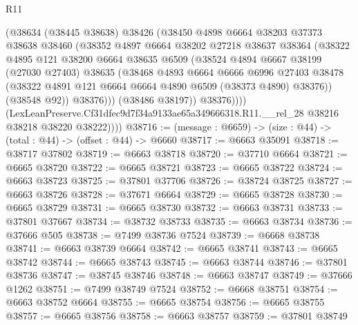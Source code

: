 \begin{lexlean}{R11}
\begin{coremodule}
                  (@38634
                    (@38445 @38638)
                    @38426
                    (@38450
                      @4898
                      @6664
                      @38203
                      @37373
                      @38638
                      @38460
                      (@38352
                        @4897
                        @6664
                        @38202
                        @27218
                        @38637
                        @38364
                        (@38322
                          @4895
                          @121
                          @38200
                          @6664
                          @38635
                          @6509
                          (@38524
                            @4894
                            @6667
                            @38199
                            (@27030 @27403)
                            @38635
                            (@38468
                              @4893
                              @6664
                              @6666
                              @6996
                              @27403
                              @38478
                              (@38322 @4891 @121 @6664 @6664 @4890 @6509 (@38373 @4890) @38376))
                            (@38548 @92))
                          @38376)))
                    (@38486 @38197))
                  @38376))))
          (LexLeanPreserve.Cf31dfec9d7f34a9133ae65a349666318.R11.__rel_28
            @38216
            @38218
            @38220
            @38222))))
@38716 := (message : @6659) -> (size : @44) -> (total : @44) -> (offset : @44) -> @6660
@38717 := @6663 @35091
@38718 := @38717 @37802
@38719 := @6663 @38718
@38720 := @37710 @6664
@38721 := @6665 @38720
@38722 := @6665 @38721
@38723 := @6665 @38722
@38724 := @6663 @38723
@38725 := @37801 @37706
@38726 := @38724 @38725
@38727 := @6663 @38726
@38728 := @37671 @6664
@38729 := @6665 @38728
@38730 := @6665 @38729
@38731 := @6665 @38730
@38732 := @6663 @38731
@38733 := @37801 @37667
@38734 := @38732 @38733
@38735 := @6663 @38734
@38736 := @37666 @505
@38738 := @7499 @38736 @7524
@38739 := @6668 @38738
@38741 := @6663 @38739 @6664
@38742 := @6665 @38741
@38743 := @6665 @38742
@38744 := @6665 @38743
@38745 := @6663 @38744
@38746 := @37801 @38736
@38747 := @38745 @38746
@38748 := @6663 @38747
@38749 := @37666 @1262
@38751 := @7499 @38749 @7524
@38752 := @6668 @38751
@38754 := @6663 @38752 @6664
@38755 := @6665 @38754
@38756 := @6665 @38755
@38757 := @6665 @38756
@38758 := @6663 @38757
@38759 := @37801 @38749

\end{coremodule}
\end{lexlean}
